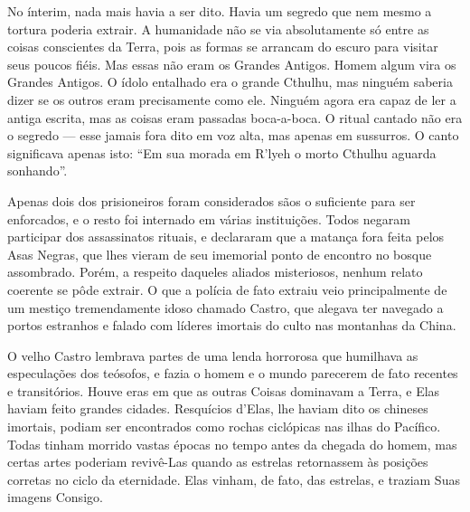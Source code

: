 \begin{pages}
\begin{Rightside}
No ínterim, nada mais havia a ser dito. Havia um segredo que nem mesmo a
tortura poderia extrair. A humanidade não se via absolutamente só entre
as coisas conscientes da Terra, pois as formas se arrancam do escuro
para visitar seus poucos fiéis. Mas essas não eram os Grandes Antigos.
Homem algum vira os Grandes Antigos. O ídolo entalhado era o grande
Cthulhu, mas ninguém saberia dizer se os outros eram precisamente como
ele. Ninguém agora era capaz de ler a antiga escrita, mas as coisas eram
passadas boca-a-boca. O ritual cantado não era o segredo --- esse jamais
fora dito em voz alta, mas apenas em sussurros. O canto significava
apenas isto: ``Em sua morada em R'lyeh o morto Cthulhu aguarda
sonhando''.

Apenas dois dos prisioneiros foram considerados sãos o suficiente para
ser enforcados, e o resto foi internado em várias instituições. Todos
negaram participar dos assassinatos rituais, e declararam que a matança
fora feita pelos Asas Negras, que lhes vieram de seu imemorial ponto de
encontro no bosque assombrado. Porém, a respeito daqueles aliados
misteriosos, nenhum relato coerente se pôde extrair. O que a polícia de
fato extraiu veio principalmente de um mestiço tremendamente idoso
chamado Castro, que alegava ter navegado a portos estranhos e falado com
líderes imortais do culto nas montanhas da China.

O velho Castro lembrava partes de uma lenda horrorosa que humilhava as
especulações dos teósofos, e fazia o homem e o mundo parecerem de fato
recentes e transitórios. Houve eras em que as outras Coisas dominavam a
Terra, e Elas haviam feito grandes cidades. Resquícios d'Elas, lhe
haviam dito os chineses imortais, podiam ser encontrados como rochas
ciclópicas nas ilhas do Pacífico. Todas tinham morrido vastas épocas no
tempo antes da chegada do homem, mas certas artes poderiam revivê-Las
quando as estrelas retornassem às posições corretas no ciclo da
eternidade. Elas vinham, de fato, das estrelas, e traziam Suas imagens
Consigo.


\end{Rightside}
\end{pages}
